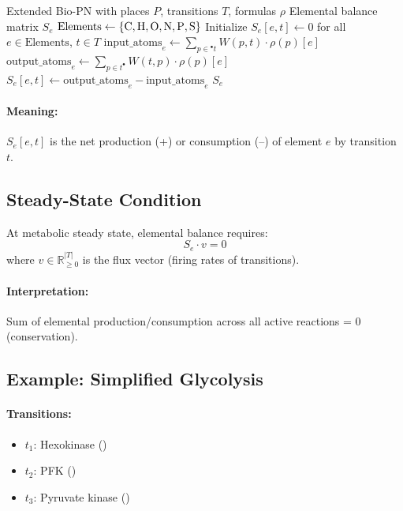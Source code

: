 \begin{algorithm}[htbp]
\caption{Construct elemental balance matrix}
\label{alg:construct-balance-matrix}
\begin{algorithmic}[1]
\Require Extended Bio-PN with places $P$, transitions $T$, formulas $\rho$
\Ensure Elemental balance matrix $S_e$
\State $\text{Elements} \gets \{\ce{C}, \ce{H}, \ce{O}, \ce{N}, \ce{P}, \ce{S}\}$
\State Initialize $S_e[e,t] \gets 0$ for all $e \in \text{Elements}$, $t \in T$
        \State $\text{input\_atoms}_e \gets \sum_{p \in {}^\bullet t} W(p,t) \cdot \rho(p)[e]$
        \State $\text{output\_atoms}_e \gets \sum_{p \in t^\bullet} W(t,p) \cdot \rho(p)[e]$
        \State $S_e[e, t] \gets \text{output\_atoms}_e - \text{input\_atoms}_e$
    \EndFor
\EndFor
\State \Return $S_e$
\end{algorithmic}
\end{algorithm}

\paragraph{Meaning:} $S_e[e,t]$ is the net production (+) or consumption (--) of element $e$ by transition $t$.

\subsection{Steady-State Condition}
\label{subsec:steady-state-condition}

At metabolic steady state, elemental balance requires:
\begin{equation}
S_e \cdot v = 0
\label{eq:steady-state-balance}
\end{equation}
where $v \in \mathbb{R}_{\geq 0}^{|T|}$ is the flux vector (firing rates of transitions).

\paragraph{Interpretation:} Sum of elemental production/consumption across all active reactions = 0 (conservation).

\subsection{Example: Simplified Glycolysis}
\label{subsec:glycolysis-balance-matrix}

\paragraph{Transitions:}
\begin{itemize}
    \item $t_1$: Hexokinase ()
    \item $t_2$: PFK ()
    \item $t_3$: Pyruvate kinase ()
\end{itemize}


